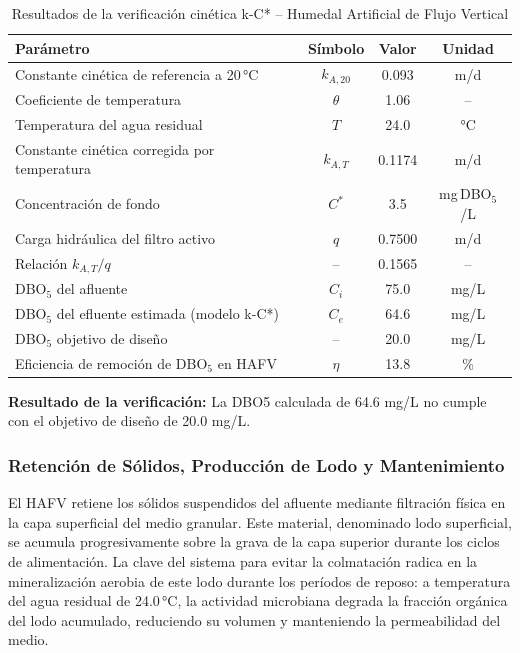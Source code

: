 \begin{table}[H]
\centering
\caption{Resultados de la verificación cinética k-C* -- Humedal Artificial de Flujo Vertical}
\label{tab:verificacion_kC}
\begin{tabular}{lccc}
\toprule
\textbf{Parámetro} & \textbf{Símbolo} & \textbf{Valor} & \textbf{Unidad} \\
\midrule
Constante cinética de referencia a 20\,°C & $k_{A,20}$ & 0.093 & m/d \\
Coeficiente de temperatura & $\theta$ & 1.06 & -- \\
Temperatura del agua residual & $T$ & 24.0 & °C \\
Constante cinética corregida por temperatura & $k_{A,T}$ & 0.1174 & m/d \\
Concentración de fondo & $C^*$ & 3.5 & mg\,DBO$_5$/L \\
Carga hidráulica del filtro activo & $q$ & 0.7500 & m/d \\
Relación $k_{A,T} / q$ & -- & 0.1565 & -- \\
DBO$_5$ del afluente & $C_i$ & 75.0 & mg/L \\
DBO$_5$ del efluente estimada (modelo k-C*) & $C_e$ & 64.6 & mg/L \\
DBO$_5$ objetivo de diseño & -- & 20.0 & mg/L \\
Eficiencia de remoción de DBO$_5$ en HAFV & $\eta$ & 13.8 & \% \\
\bottomrule
\end{tabular}
\end{table}

\textbf{Resultado de la verificación:} La DBO5 calculada de 64.6 mg/L no cumple con el objetivo de diseño de 20.0 mg/L.

\subsubsection*{Retención de Sólidos, Producción de Lodo y Mantenimiento}

El HAFV retiene los sólidos suspendidos del afluente mediante filtración física en la capa superficial del medio granular. Este material, denominado lodo superficial, se acumula progresivamente sobre la grava de la capa superior durante los ciclos de alimentación. La clave del sistema para evitar la colmatación radica en la mineralización aerobia de este lodo durante los períodos de reposo: a temperatura del agua residual de 24.0\,°C, la actividad microbiana degrada la fracción orgánica del lodo acumulado, reduciendo su volumen y manteniendo la permeabilidad del medio.

